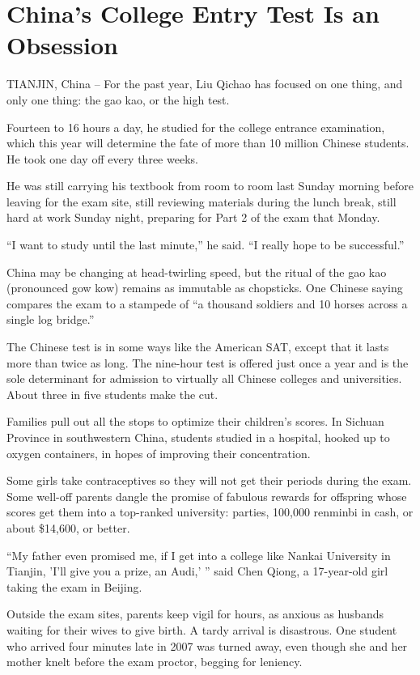 ﻿\documentclass[12pt,a4paper,onecolumn]{article}
\begin{document}
\section{China's College Entry Test Is an Obsession}

TIANJIN, China -- For the past year, Liu Qichao has focused on one thing, and only one thing: the
gao kao, or the high test.

Fourteen to 16 hours a day, he studied for the college entrance examination, which this year will
determine the fate of more than 10 million Chinese students. He took one day off every three weeks.

He was still carrying his textbook from room to room last Sunday morning before leaving for the exam
site, still reviewing materials during the lunch break, still hard at work Sunday night, preparing
for Part 2 of the exam that Monday.

``I want to study until the last minute,'' he said. ``I really hope to be successful.''

China may be changing at head-twirling speed, but the ritual of the gao kao (pronounced gow kow)
remains as immutable as chopsticks. One Chinese saying compares the exam to a stampede of ``a
thousand soldiers and 10 horses across a single log bridge.''

The Chinese test is in some ways like the American SAT, except that it lasts more than twice as
long. The nine-hour test is offered just once a year and is the sole determinant for admission to
virtually all Chinese colleges and universities. About three in five students make the cut.

Families pull out all the stops to optimize their children's scores. In Sichuan Province in
southwestern China, students studied in a hospital, hooked up to oxygen containers, in hopes of
improving their concentration.

Some girls take contraceptives so they will not get their periods during the exam. Some well-off
parents dangle the promise of fabulous rewards for offspring whose scores get them into a top-ranked
university: parties, 100,000 renminbi in cash, or about \$14,600, or better.

``My father even promised me, if I get into a college like Nankai University in Tianjin, 'I'll give
you a prize, an Audi,' '' said Chen Qiong, a 17-year-old girl taking the exam in Beijing.

Outside the exam sites, parents keep vigil for hours, as anxious as husbands waiting for their wives
to give birth. A tardy arrival is disastrous. One student who arrived four minutes late in 2007 was
turned away, even though she and her mother knelt before the exam proctor, begging for leniency.
\end{document}
